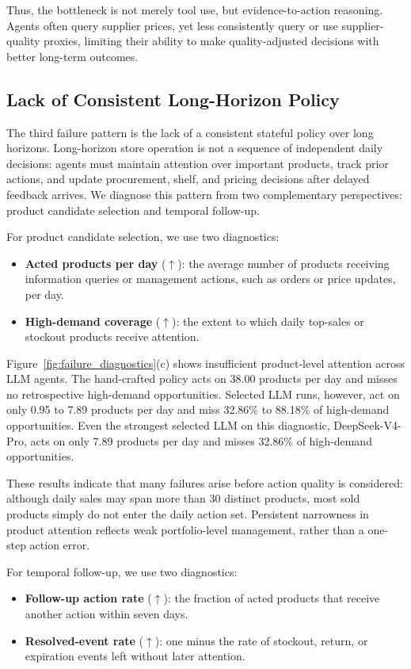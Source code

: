 Thus, the bottleneck is not merely tool use, but evidence-to-action reasoning. Agents often query supplier prices, yet less consistently query or use supplier-quality proxies, limiting their ability to make quality-adjusted decisions with better long-term outcomes.
\subsection{Lack of Consistent Long-Horizon Policy}

The third failure pattern is the lack of a consistent stateful policy over long horizons. Long-horizon store operation is not a sequence of independent daily decisions: agents must maintain attention over important products, track prior actions, and update procurement, shelf, and pricing decisions after delayed feedback arrives. We diagnose this pattern from two complementary perspectives: product candidate selection and temporal follow-up.

For product candidate selection, we use two diagnostics:
\begin{itemize}[leftmargin=*]
    \item \textbf{Acted products per day} ($\uparrow$): the average number of products receiving information queries or management actions, such as orders or price updates, per day.
    \item \textbf{High-demand coverage} ($\uparrow$): the extent to which daily top-sales or stockout products receive attention.
\end{itemize}

Figure~\ref{fig:failure_diagnostics}(c) shows insufficient product-level attention across LLM agents. The hand-crafted policy acts on 38.00 products per day and misses no retrospective high-demand opportunities. Selected LLM runs, however, act on only 0.95 to 7.89 products per day and miss 32.86\% to 88.18\% of high-demand opportunities. Even the strongest selected LLM on this diagnostic, DeepSeek-V4-Pro, acts on only 7.89 products per day and misses 32.86\% of high-demand opportunities.

These results indicate that many failures arise before action quality is considered: although daily sales may span more than 30 distinct products, most sold products simply do not enter the daily action set. Persistent narrowness in product attention reflects weak portfolio-level management, rather than a one-step action error.

For temporal follow-up, we use two diagnostics:
\begin{itemize}[leftmargin=*]
    \item \textbf{Follow-up action rate} ($\uparrow$): the fraction of acted products that receive another action within seven days.
    \item \textbf{Resolved-event rate} ($\uparrow$): one minus the rate of stockout, return, or expiration events left without later attention.
\end{itemize}

